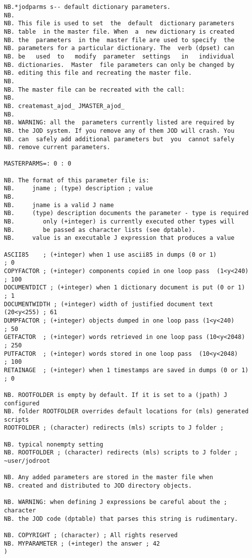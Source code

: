 \begin{lstlisting}[frame=single,framerule=0pt,basicstyle=\ttfamily\footnotesize]
NB.*jodparms s-- default dictionary parameters.
NB.
NB. This file is used to set  the  default  dictionary parameters
NB. table  in the master file. When  a  new dictionary is created
NB. the  parameters  in the  master file are used to specify  the
NB. parameters for a particular dictionary. The  verb (dpset) can
NB. be   used  to   modify  parameter  settings   in   individual
NB. dictionaries.  Master  file parameters can only be changed by
NB. editing this file and recreating the master file.
NB.
NB. The master file can be recreated with the call:
NB.
NB. createmast_ajod_ JMASTER_ajod_
NB.
NB. WARNING: all the  parameters currently listed are required by
NB. the JOD system. If you remove any of them JOD will crash. You
NB. can  safely add additional parameters but  you  cannot safely
NB. remove current parameters.

MASTERPARMS=: 0 : 0

NB. The format of this parameter file is:
NB.     jname ; (type) description ; value
NB. 
NB.     jname is a valid J name
NB.     (type) description documents the parameter - type is required
NB.        only (+integer) is currently executed other types will
NB.        be passed as character lists (see dptable).
NB.     value is an executable J expression that produces a value

ASCII85    ; (+integer) when 1 use ascii85 in dumps (0 or 1)            ; 0  
COPYFACTOR ; (+integer) components copied in one loop pass  (1<y<240)   ; 100
DOCUMENTDICT ; (+integer) when 1 dictionary document is put (0 or 1)    ; 1
DOCUMENTWIDTH ; (+integer) width of justified document text  (20<y<255) ; 61
DUMPFACTOR ; (+integer) objects dumped in one loop pass (1<y<240)       ; 50
GETFACTOR  ; (+integer) words retrieved in one loop pass (10<y<2048)    ; 250
PUTFACTOR  ; (+integer) words stored in one loop pass  (10<y<2048)      ; 100
RETAINAGE  ; (+integer) when 1 timestamps are saved in dumps (0 or 1)   ; 0

NB. ROOTFOLDER is empty by default. If it is set to a (jpath) J configured 
NB. folder ROOTFOLDER overrides default locations for (mls) generated scripts 
ROOTFOLDER ; (character) redirects (mls) scripts to J folder ; 

NB. typical nonempty setting
NB. ROOTFOLDER ; (character) redirects (mls) scripts to J folder ; ~user/jodroot 

NB. Any added parameters are stored in the master file when
NB. created and distributed to JOD directory objects.  

NB. WARNING: when defining J expressions be careful about the ; character 
NB. the JOD code (dptable) that parses this string is rudimentary.

NB. COPYRIGHT ; (character) ; All rights reserved
NB. MYPARAMETER ; (+integer) the answer ; 42
)
\end{lstlisting}


